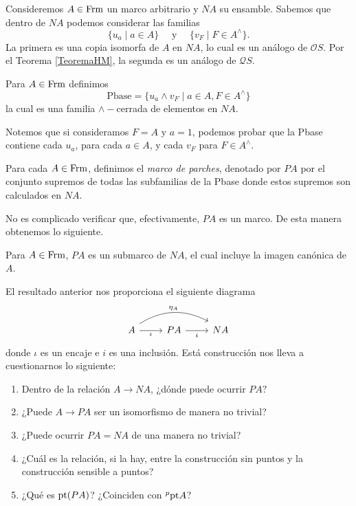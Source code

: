 Consideremos $A\in \mathrm{Frm}$ un marco arbitrario y $NA$ su ensamble. Sabemos que dentro de $NA$ podemos considerar las familias
\[
\{u_a\mid a\in A\}\quad\mbox{ y }\quad\{v_F\mid F\in A^\wedge\}.
\]
La primera es una copia isomorfa de $A$ en $NA$, lo cual es un análogo de $\mathcal{O}S$. Por el Teorema \ref{TeoremaHM}, la segunda es un análogo de $\mathcal{Q}S$.

\begin{dfn}\label{Definición7.1.1}
    Para $A\in\mathrm{Frm}$ definimos
    \[
    \mbox{Pbase}=\{u_a\wedge v_F\mid a\in A, F\in A^\wedge\}
    \]
    la cual es una familia $\wedge-$cerrada de elementos en $NA$.
\end{dfn}

Notemos que si consideramos $F=A$ y $a=1$, podemos probar que la Pbase contiene cada $u_a$, para cada $a\in A$, y cada $v_F$ para $F\in A^\wedge$.

\begin{dfn}\label{Definicion7.1.2}
    Para cada $A\in \mathrm{Frm}$, definimos el \emph{marco de parches}, denotado por $PA$ por el conjunto supremos de todas las subfamilias de la Pbase donde estos supremos son calculados en $NA$.
\end{dfn}

No es complicado verificar que, efectivamente, $PA$ es un marco. De esta manera obtenemos lo siguiente.

\begin{thm}\label{Teorema7.1.3}
    Para $A\in \mathrm{Frm}$, $PA$ es un submarco de $NA$, el cual incluye la imagen canónica de $A$.
\end{thm}

El resultado anterior nos proporciona el siguiente diagrama
\[
\begin{tikzcd}
A \arrow[r, "\iota"'] \arrow[rr, "\eta_A", bend left, shift left] & PA \arrow[r, "i"'] & NA
\end{tikzcd}
\]
donde $\iota$ es un encaje e $i$ es una inclusión. Está construcción nos lleva a cuestionarnos lo siguiente:
\begin{enumerate}[P1)]
    \item Dentro de la relación $A\to NA$, ¿dónde puede ocurrir $PA?$
    \item ¿Puede $A\to PA$ ser un isomorfismo de manera no trivial?
    \item ¿Puede ocurrir $PA=NA$ de una manera no trivial?
    \item ¿Cuál es la relación, si la hay, entre la construcción sin puntos y la construcción sensible a puntos?

    \item ¿Qué es $\mathrm{pt} (PA)$? ¿Coinciden con $^p\mathrm{pt} A$?
\end{enumerate}

